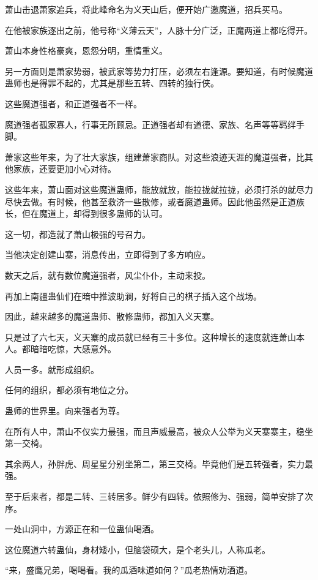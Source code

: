 
\begin{this_body}

萧山击退萧家追兵，将此峰命名为义天山后，便开始广邀魔道，招兵买马。

在他被家族逐出之前，他号称“义薄云天”，人脉十分广泛，正魔两道上都吃得开。

萧山本身性格豪爽，恩怨分明，重情重义。

另一方面则是萧家势弱，被武家等势力打压，必须左右逢源。要知道，有时候魔道蛊师也是得罪不起的，尤其是那些五转、四转的独行侠。

这些魔道强者，和正道强者不一样。

魔道强者孤家寡人，行事无所顾忌。正道强者却有道德、家族、名声等等羁绊手脚。

萧家这些年来，为了壮大家族，组建萧家商队。对这些浪迹天涯的魔道强者，比其他家族，还要更加小心对待。

这些年来，萧山面对这些魔道蛊师，能放就放，能拉拢就拉拢，必须打杀的就尽力尽快去做。有时候，他甚至救济一些散修，或者魔道蛊师。因此他虽然是正道族长，但在魔道上，却得到很多蛊师的认可。

这一切，都造就了萧山极强的号召力。

当他决定创建山寨，消息传出，立即得到了多方响应。

数天之后，就有数位魔道强者，风尘仆仆，主动来投。

再加上南疆蛊仙们在暗中推波助澜，好将自己的棋子插入这个战场。

因此，越来越多的魔道蛊师、散修蛊师，都加入义天寨。

只是过了六七天，义天寨的成员就已经有三十多位。这种增长的速度就连萧山本人。都暗暗吃惊，大感意外。

人员一多。就形成组织。

任何的组织，都必须有地位之分。

蛊师的世界里。向来强者为尊。

在所有人中，萧山不仅实力最强，而且声威最高，被众人公举为义天寨寨主，稳坐第一交椅。

其余两人，孙胖虎、周星星分别坐第二，第三交椅。毕竟他们是五转强者，实力最强。

至于后来者，都是二转、三转居多。鲜少有四转。依照修为、强弱，简单安排了次序。

一处山洞中，方源正在和一位蛊仙喝酒。

这位魔道六转蛊仙，身材矮小，但脑袋硕大，是个老头儿，人称瓜老。

“来，盛鹰兄弟，喝喝看。我的瓜酒味道如何？”瓜老热情劝酒道。


\end{this_body}
